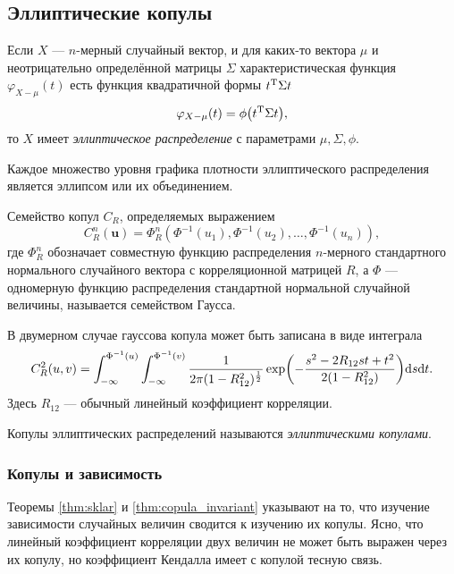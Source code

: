 \subsection*{Эллиптические копулы}

\begin{define}
	Если $X$ --- $n$-мерный случайный вектор, и для каких-то вектора $\mu$ и неотрицательно определённой матрицы $\Sigma$ характеристическая функция $\varphi_{X - \mu}(t)$ есть функция квадратичной формы ${t}^\mathrm{T}\Sigma t$
	\[
	\varphi_{X - \mu}(t) = \phi\brts*{\trans{t} \Sigma t},
	\]
то $X$ имеет \emph{эллиптическое распределение}\cite{Cambanis1981368} с параметрами $\mu, \Sigma, \phi$.
\end{define}

Каждое множество уровня графика плотности эллиптического распределения является эллипсом или их объединением.

\begin{define}
	Семейство копул $C_R$, определяемых выражением\cite{Embrechts01modellingdependence}
\[
C_R^n(\bm{u}) = \Phi_R^n(\Phi^{-1}(u_1), \Phi^{-1}(u_2), \ldots, \Phi^{-1}(u_n)),
\]
где $\Phi_R^n$ обозначает совместную функцию распределения $n$-мерного стандартного нормального случайного вектора с корреляционной матрицей $R$, а $\Phi$ --- одномерную функцию распределения стандартной нормальной случайной величины,
называется семейством Гаусса.
\end{define}

В двумерном случае гауссова копула может быть записана в виде интеграла
\[
C_R^2(u, v) = \int_{-\infty}^{\Phi^{-1}(u)} \int_{-\infty}^{\Phi^{-1}(v)}\frac{1}{2\pi(1 - R_{12}^2)^\frac{1}{2}}\operatorname{exp} \brts*{-\frac{s^2 - 2R_{12}st + t^2}{2(1 - R_{12}^2)}}\d s\d t.
\]
Здесь $R_{12}$ --- обычный линейный коэффициент корреляции.

\begin{define}
	Копулы эллиптических распределений называются \emph{эллиптическими копулами}.
\end{define}

\subsubsection*{Копулы и зависимость}

Теоремы \ref{thm:sklar} и \ref{thm:copula_invariant} указывают на то, что изучение зависимости случайных величин сводится к изучению их копулы. Ясно, что линейный коэффициент корреляции двух величин не может быть выражен через их копулу, но коэффициент Кендалла имеет с копулой тесную связь.

